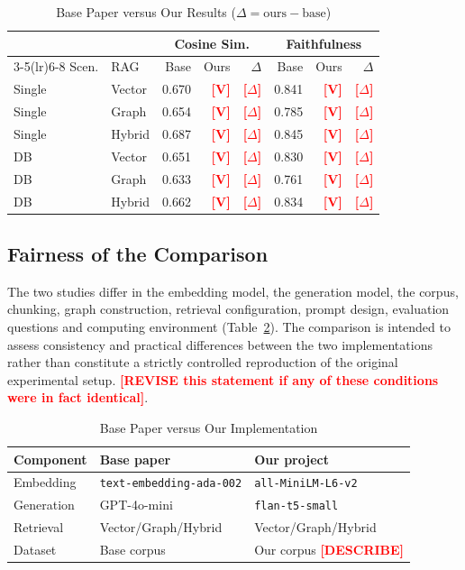 \documentclass[conference]{IEEEtran}
\newcommand{\ph}[1]{\textbf{\textcolor{red}{[#1]}}}
\begin{document}
\begin{table}[t]
\caption{Base Paper versus Our Results ($\Delta=\text{ours}-\text{base}$)}
\label{tab:compare}
\centering
\footnotesize
\setlength{\tabcolsep}{3pt}
\begin{tabular}{llrrrrrr}
\toprule
 & & \multicolumn{3}{c}{Cosine Sim.} & \multicolumn{3}{c}{Faithfulness} \\
\cmidrule(lr){3-5}\cmidrule(lr){6-8}
Scen. & RAG & Base & Ours & $\Delta$ & Base & Ours & $\Delta$ \\
\midrule
Single & Vector & 0.670 & \ph{V} & \ph{$\Delta$} & 0.841 & \ph{V} & \ph{$\Delta$} \\
Single & Graph  & 0.654 & \ph{V} & \ph{$\Delta$} & 0.785 & \ph{V} & \ph{$\Delta$} \\
Single & Hybrid & 0.687 & \ph{V} & \ph{$\Delta$} & 0.845 & \ph{V} & \ph{$\Delta$} \\
DB & Vector & 0.651 & \ph{V} & \ph{$\Delta$} & 0.830 & \ph{V} & \ph{$\Delta$} \\
DB & Graph  & 0.633 & \ph{V} & \ph{$\Delta$} & 0.761 & \ph{V} & \ph{$\Delta$} \\
DB & Hybrid & 0.662 & \ph{V} & \ph{$\Delta$} & 0.834 & \ph{V} & \ph{$\Delta$} \\
\bottomrule
\end{tabular}
\end{table}

\subsection{Fairness of the Comparison}
The two studies differ in the embedding model, the generation model, the corpus, chunking, graph construction, retrieval configuration, prompt design, evaluation questions and computing environment (Table~\ref{tab:config}). The comparison is intended to assess consistency and practical differences between the two implementations rather than constitute a strictly controlled reproduction of the original experimental setup. \ph{REVISE this statement if any of these conditions were in fact identical}.

\begin{table}[t]
\caption{Base Paper versus Our Implementation}
\label{tab:config}
\centering
\small
\begin{tabular}{p{1.5cm}p{2.9cm}p{2.9cm}}
\toprule
Component & Base paper \cite{ghanadian2026base} & Our project \\
\midrule
Embedding & \texttt{text-embedding-ada-002} & \texttt{all-MiniLM-L6-v2} \\
Generation & GPT-4o-mini & \texttt{flan-t5-small} \\
Retrieval & Vector/Graph/Hybrid & Vector/Graph/Hybrid \\
Dataset & Base corpus & Our corpus \ph{DESCRIBE} \\
\bottomrule
\end{tabular}
\end{table}
\end{document}
